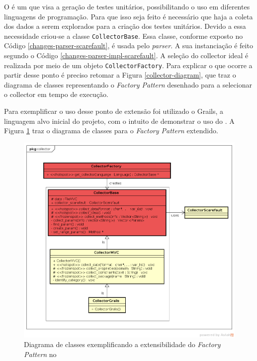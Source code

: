 O \scarefault é um \framework que visa a geração de testes unitários, possibilitando
o uso em diferentes linguagens de programação. Para que isso seja feito é necessário
que haja a coleta dos dados a serem explorados para a criação dos testes unitários.
Devido a essa necessidade criou-se a classe \lstinline|CollectorBase|. Essa classe,
conforme exposto no Código \ref{changes-parser-scarefault}, é usada pelo \textit{parser}.
A sua instanciação é feito segundo o Código \ref{changes-parser-impl-scarefault}. A seleção do \textsf{collector} ideal é realizada por meio de um objeto \lstinline|CollectorFactory|. Para explicar o que ocorre a partir desse ponto é preciso retomar a Figura
\ref{collector-diagram}, que traz o diagrama de classes representando o
\textit{Factory Pattern} desenhado para a selecionar o \textsf{collector} em tempo
de execução.

Para exemplificar o uso desse ponto de extensão foi utilizado o \textsf{Grails}, a linguagem
alvo inicial do projeto, com o intuito de demonstrar o uso do \Scarefault. A Figura
\ref{collector-grails-class-diagram} traz o diagrama de classes para o
\textit{Factory Pattern} extendido.
\begin{figure}[h]
  \centering
    \includegraphics[width=\textwidth]{figuras/collector-grails-class-diagram.png}
    \caption{Diagrama de classes exemplificando a extensibilidade do \textit{Factory Pattern} no \framework}
    \label{collector-grails-class-diagram}
\end{figure}
\FloatBarrier

